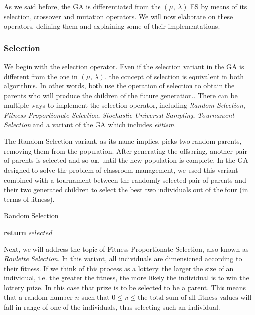 As we said before, the GA is differentiated from the $(\mu,\ \lambda)$ ES by means of its selection, crossover and mutation operators. We will now elaborate on these operators, defining them and explaining some of their implementations.

\subsubsection{Selection}

We begin with the selection operator. Even if the selection variant in the GA is different from the one in $(\mu,\ \lambda)$, the concept of selection is equivalent in both algorithms. In other words, both use the operation of selection to obtain the parents who will produce the children of the future generation.. There can be multiple ways to implement the selection operator, including \textit{Random Selection}, \textit{Fitness-Proportionate Selection}, \textit{Stochastic Universal Sampling}, \textit{Tournament Selection} and a variant of the GA which includes \textit{elitism}.

The Random Selection variant, as its name implies, picks two random parents, removing them from the population. After generating the offspring, another pair of parents is selected and so on, until the new population is complete. In the GA designed to solve the problem of classroom management, we used this variant combined with a tournament between the randomly selected pair of parents and their two generated children to select the best two individuals out of the four (in terms of fitness).

\begin{algorithm}[H]
    \caption{Random Selection}
    \begin{algorithmic}[1]
             
            \State \textbf{return} $selected$
        \EndProcedure
    \end{algorithmic}
\end{algorithm}

Next, we will address the topic of Fitness-Proportionate Selection, also known as \textit{Roulette Selection}. In this variant, all individuals are dimensioned according to their fitness. If we think of this process as a lottery, the larger the size of an individual, i.e. the greater the fitness, the more likely the individual is to win the lottery prize. In this case that prize is to be selected to be a parent. This means that a random number $n$ such that $0 \leq n \leq \text{the total sum of all fitness values}$ will fall in range of one of the individuals, thus selecting such an individual.

